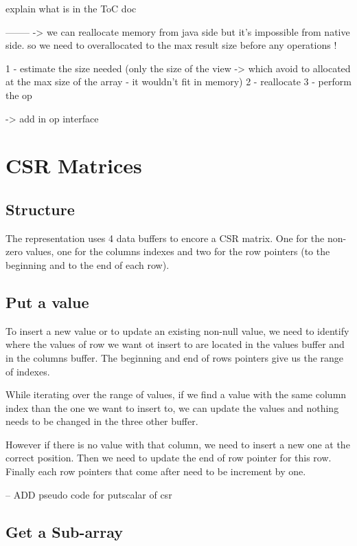 explain what is in the ToC doc

--------
-> we can reallocate memory from java side but it's impossible from native side. so we need to overallocated to the max result size before any operations !

1 - estimate the size needed (only the size of the view -> which avoid to allocated at the max size of the array - it wouldn't fit in memory)
2 - reallocate
3 - perform the op

-> add in op interface


\section{CSR Matrices}
\subsection{Structure}

The representation uses 4 data buffers to encore a CSR matrix. One for the non-zero values, one for the columns indexes and two for the row pointers (to the beginning and to the end of each row).

\subsection{Put a value}

To insert a new value or to update an existing non-null value, we need to identify where the values of row we want ot insert to are located in the values buffer and in the columns buffer. The beginning and end of rows pointers give us the range of indexes.

While iterating over the range of values, if we find a value with the same column index than the one we want to insert to, we can update the values and nothing needs to be changed in the three other buffer. 

However if there is no value with that column, we need to insert a new one at the correct position. Then we need to update the end of row pointer for this row. Finally each row pointers that come after need to be increment by one.


-- ADD pseudo code for putscalar of csr




\subsection{Get a Sub-array}

